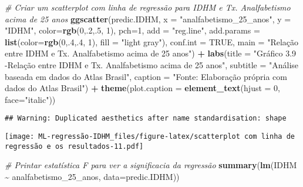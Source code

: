 \documentclass[
]{article}
\newenvironment{Shaded}{\begin{snugshade}}{\end{snugshade}}
\newcommand{\AttributeTok}[1]{\textcolor[rgb]{0.13,0.29,0.53}{#1}}
\newcommand{\CommentTok}[1]{\textcolor[rgb]{0.56,0.35,0.01}{\textit{#1}}}
\newcommand{\ConstantTok}[1]{\textcolor[rgb]{0.56,0.35,0.01}{#1}}
\newcommand{\DecValTok}[1]{\textcolor[rgb]{0.00,0.00,0.81}{#1}}
\newcommand{\FunctionTok}[1]{\textcolor[rgb]{0.13,0.29,0.53}{\textbf{#1}}}
\newcommand{\NormalTok}[1]{#1}
\newcommand{\SpecialCharTok}[1]{\textcolor[rgb]{0.81,0.36,0.00}{\textbf{#1}}}
\newcommand{\StringTok}[1]{\textcolor[rgb]{0.31,0.60,0.02}{#1}}
\begin{document}
\begin{Shaded}
\begin{Highlighting}[]
\CommentTok{\# Criar um scatterplot com linha de regressão para IDHM e Tx. Analfabetismo acima de 25 anos}
\FunctionTok{ggscatter}\NormalTok{(predic.IDHM, }\AttributeTok{x =} \StringTok{"analfabetismo\_25\_anos"}\NormalTok{, }\AttributeTok{y =} \StringTok{"IDHM"}\NormalTok{, }
          \AttributeTok{color=}\FunctionTok{rgb}\NormalTok{(}\DecValTok{0}\NormalTok{,.}\DecValTok{2}\NormalTok{,.}\DecValTok{5}\NormalTok{,  }\DecValTok{1}\NormalTok{), }\AttributeTok{pch=}\DecValTok{1}\NormalTok{, }\AttributeTok{add =} \StringTok{"reg.line"}\NormalTok{, }
          \AttributeTok{add.params =} \FunctionTok{list}\NormalTok{(}\AttributeTok{color=}\FunctionTok{rgb}\NormalTok{(}\DecValTok{0}\NormalTok{,.}\DecValTok{4}\NormalTok{,.}\DecValTok{4}\NormalTok{,  }\DecValTok{1}\NormalTok{), }\AttributeTok{fill =} \StringTok{"light gray"}\NormalTok{), }
          \AttributeTok{conf.int =} \ConstantTok{TRUE}\NormalTok{, }\AttributeTok{main =} \StringTok{"Relação entre IDHM e Tx. Analfabetismo acima de 25 anos"}\NormalTok{) }\SpecialCharTok{+}
  \FunctionTok{labs}\NormalTok{(}\AttributeTok{title =} \StringTok{"Gráfico 3.9 {-}Relação entre IDHM e Tx. Analfabetismo acima de 25 anos"}\NormalTok{,}
       \AttributeTok{subtitle =} \StringTok{"Análise baseada em dados do Atlas Brasil"}\NormalTok{,}
       \AttributeTok{caption =} \StringTok{"Fonte: Elaboração própria com dados do Atlas Brasil"}\NormalTok{) }\SpecialCharTok{+}
  \FunctionTok{theme}\NormalTok{(}\AttributeTok{plot.caption =} \FunctionTok{element\_text}\NormalTok{(}\AttributeTok{hjust =} \DecValTok{0}\NormalTok{, }\AttributeTok{face=}\StringTok{"italic"}\NormalTok{))}
\end{Highlighting}
\end{Shaded}

\begin{verbatim}
## Warning: Duplicated aesthetics after name standardisation: shape
\end{verbatim}

\texttt{[image: ML-regressão-IDHM\_files/figure-latex/scatterplot com linha de regressão e os resultados-11.pdf]}

\begin{Shaded}
\begin{Highlighting}[]
\CommentTok{\# Printar estatística F para ver a significacia da regressão}
\FunctionTok{summary}\NormalTok{(}\FunctionTok{lm}\NormalTok{(IDHM }\SpecialCharTok{\textasciitilde{}}\NormalTok{ analfabetismo\_25\_anos, }\AttributeTok{data=}\NormalTok{predic.IDHM))}
\end{Highlighting}
\end{Shaded}
\end{document}

